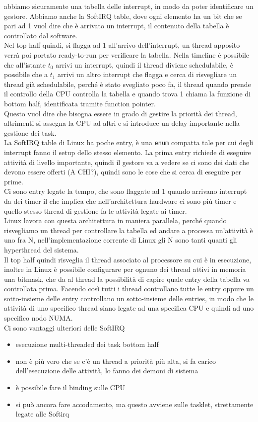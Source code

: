 \documentclass[12pt, oneside]{extbook}
\begin{document}
abbiamo sicuramente una tabella delle interrupt, in modo da poter identificare un gestore. Abbiamo anche la SoftIRQ table, dove ogni elemento ha un bit che se pari ad 1 vuol dire che è arrivato un interrupt, il contenuto della tabella è controllato dal software.\\Nel top half quindi, si flagga ad 1 all'arrivo dell'interrupt, un thread apposito verrà poi portato ready-to-run per verificare la tabella. Nella timeline è possibile che all'istante $t_0$ arrivi un interrupt, quindi il thread diviene schedulabile, è possibile che a $t_1$ arrivi un altro interrupt che flagga e cerca di risvegliare un thread già schedulabile, perché è stato svegliato poco fa, il thread quando prende il controllo della CPU controlla la tabella e quando trova 1 chiama la funzione di bottom half, identificata tramite function pointer.\\Questo vuol dire che bisogna essere in grado di gestire la priorità dei thread, altrimenti si assegna la CPU ad altri e si introduce un delay importante nella gestione dei task.\\La SoftIRQ table di Linux ha poche entry, è una \texttt{enum} compatta tale per cui degli interrupt fanno il setup dello stesso elemento. La prima entry richiede di eseguire attività di livello importante, quindi il gestore va a vedere se ci sono dei dati che devono essere offerti (A CHI?), quindi sono le cose che si cerca di eseguire per prime.\\Ci sono entry legate la tempo, che sono flaggate ad 1 quando arrivano interrupt da dei timer il che implica che nell'architettura hardware ci sono più timer e quello stesso thread di gestione fa le attività legate ai timer.\\Linux lavora con questa architettura in maniera parallela, perché quando risvegliamo un thread per controllare la tabella ed andare a processa un'attività è uno fra N, nell'implementazione corrente di Linux gli N sono tanti quanti gli hyperthread del sistema.\\Il top half quindi risveglia il thread associato al processore su cui è in esecuzione, inoltre in Linux è possibile configurare per ognuno dei thread attivi in memoria una bitmask, che da al thread la possibilità di capire quale entry della tabella va controllata prima. Facendo così tutti i thread controllano tutte le entry oppure un sotto-insieme delle entry controllano un sotto-insieme delle entries, in modo che le attività di uno specifico thread siano legate ad una specifica CPU e quindi ad uno specifico nodo NUMA.\\Ci sono vantaggi ulteriori delle SoftIRQ
\begin{itemize}
\item esecuzione multi-threaded dei task bottom half
\item non è più vero che se c'è un thread a priorità più alta, si fa carico dell'esecuzione delle attività, lo fanno dei demoni di sistema
\item è possibile fare il binding sulle CPU
\item si può ancora fare accodamento, ma questo avviene sulle tasklet, strettamente legate alle Softirq
\end{itemize}
\end{document}
